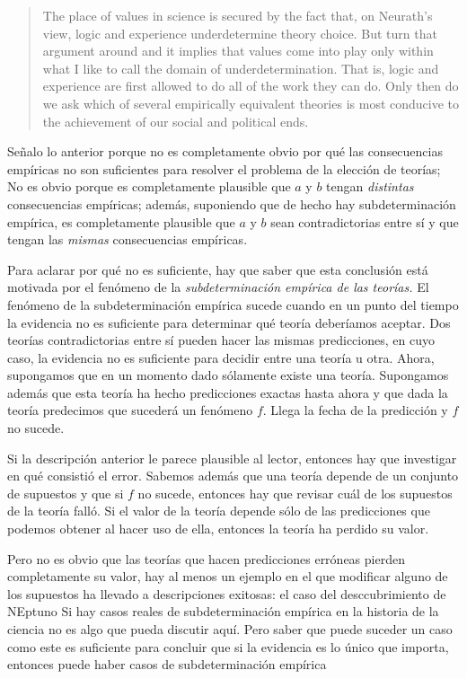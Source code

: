 \begin{quote}
	The place of values in science is secured by the fact that, on Neurath’s view, logic and experience underdetermine theory choice.
	But turn that argument around and it implies that values come into play only within what I like to call the domain of underdetermination. 
	That is, logic and experience are first allowed to do all of the work they can do. 
	Only then do we ask which of several empirically equivalent theories is most conducive to the achievement of our social and political ends. \parencite[p.~10]{Howard2006}
\end{quote}

Señalo lo anterior porque no es completamente obvio por qué las consecuencias empíricas no son suficientes para resolver el problema de la elección de teorías;
No es obvio porque es completamente plausible que $a$ y $b$ tengan \emph{distintas} consecuencias empíricas;
además, suponiendo que de hecho hay subdeterminación empírica, es completamente plausible que $a$ y $b$ sean contradictorias entre sí y que tengan las \emph{mismas} consecuencias empíricas.

Para aclarar por qué no es suficiente, hay que saber que esta conclusión está motivada por el fenómeno de la \emph{subdeterminación empírica de las teorías.}
El fenómeno de la subdeterminación empírica sucede cuando en un punto del tiempo la evidencia no es suficiente para determinar qué teoría deberíamos aceptar.
Dos teorías contradictorias entre sí pueden hacer las mismas predicciones, en cuyo caso, la evidencia no es suficiente para decidir entre una teoría u otra.
Ahora, supongamos que en un momento dado sólamente existe una teoría.
Supongamos además que esta teoría ha hecho predicciones exactas hasta ahora y que dada la teoría predecimos que sucederá un fenómeno $f$.
Llega la fecha de la predicción y $f$ no sucede.

Si la descripción anterior le parece plausible al lector, entonces hay que investigar en qué consistió el error.
Sabemos además que una teoría depende de un conjunto de supuestos y que si $f$ no sucede, entonces hay que revisar cuál de los supuestos de la teoría falló.
Si el valor de la teoría depende sólo de las predicciones que podemos obtener al hacer uso de ella, entonces la teoría ha perdido su valor.

Pero no es obvio que las teorías que hacen predicciones erróneas pierden completamente su valor, hay al menos un ejemplo en el que modificar alguno de los supuestos ha llevado a descripciones exitosas: el caso del desccubrimiento de NEptuno  
Si hay casos reales de subdeterminación empírica en la historia de la ciencia no es algo que pueda discutir aquí.
Pero saber que puede suceder un caso como este es suficiente para concluir que si la evidencia es lo único que importa, entonces puede haber casos de subdeterminación empírica 



